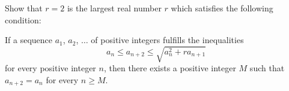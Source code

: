 \begin{problem}
    Show that $r = 2$ is the largest real number $r$ which satisfies the following condition:

    If a sequence $a_1$, $a_2$, $\ldots$ of positive integers fulfills the inequalities
    \[a_n \leq a_{n+2} \leq\sqrt{a_n^2+ra_{n+1}}\]for every positive integer $n$, then there exists a positive integer $M$ such that $a_{n+2} = a_n$ for every $n \geq M$.

    \label{20APMO2}
\end{problem}